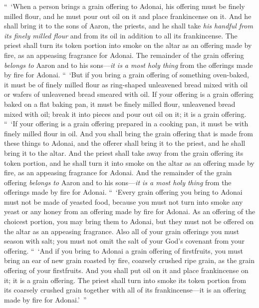 \begin{biblechapter} %
 “ ‘When a person brings a grain offering to Adonai, his offering must be finely milled flour, and he must pour out oil on it and place frankincense on it.
\verse And he shall bring it to the sons of Aaron, the priests, and he shall take \textit{his handful from its finely milled flour} and from its oil in addition to all its frankincense. The priest shall turn its token portion into smoke on the altar as an offering made by fire, as an appeasing fragrance for Adonai.
\verse The remainder of the grain offering \textit{belongs to} Aaron and to his sons—\textit{it is a most holy thing} from the offerings made by fire for Adonai.
\verse “ ‘But if you bring a grain offering of something oven-baked, it must be of finely milled flour as ring-shaped unleavened bread mixed with oil or wafers of unleavened bread smeared with oil.
\verse If your offering is a grain offering baked on a flat baking pan, it must be finely milled flour, unleavened bread mixed with oil;
\verse break it into pieces and pour out oil on it; it is a grain offering.
\verse “ ‘If your offering is a grain offering prepared in a cooking pan, it must be with finely milled flour in oil.
\verse And you shall bring the grain offering that is made from these things to Adonai, and the offerer shall bring it to the priest, and he shall bring it to the altar.
\verse And the priest shall take away from the grain offering its token portion, and he shall turn it into smoke on the altar as an offering made by fire, as an appeasing fragrance for Adonai.
\verse And the remainder of the grain offering \textit{belongs to} Aaron and to his sons—\textit{it is a most holy thing} from the offerings made by fire for Adonai.
\verse “ ‘Every grain offering you bring to Adonai must not be made of yeasted food, because you must not turn into smoke any yeast or any honey from an offering made by fire for Adonai.
\verse As an offering of the choicest portion, you may bring them to Adonai, but they must not be offered on the altar as an appeasing fragrance.
\verse Also all of your grain offerings you must season with salt; you must not omit the salt of your God’s covenant from your offering.
\verse “ ‘And if you bring to Adonai a grain offering of firstfruits, you must bring an ear of new grain roasted by fire, coarsely crushed ripe grain, as the grain offering of your firstfruits.
\verse And you shall put oil on it and place frankincense on it; it is a grain offering.
\verse The priest shall turn into smoke its token portion from its coarsely crushed grain together with all of its frankincense—it is an offering made by fire for Adonai.’ ”
\end{biblechapter}


